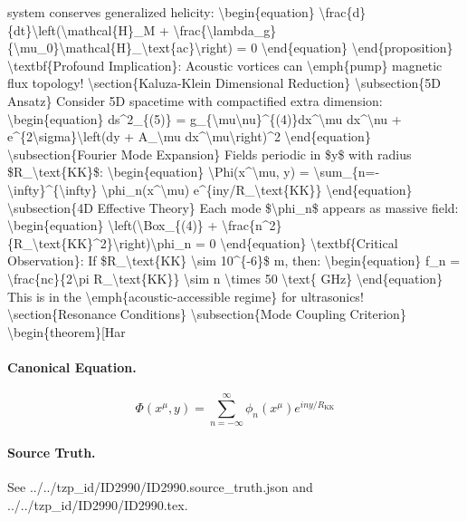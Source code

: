 system conserves generalized helicity: \textbackslash{}begin\{equation\} \textbackslash{}frac\{d\}\{dt\}\textbackslash{}left(\textbackslash{}mathcal\{H\}\_M + \textbackslash{}frac\{\textbackslash{}lambda\_g\}\{\textbackslash{}mu\_0\}\textbackslash{}mathcal\{H\}\_\textbackslash{}text\{ac\}\textbackslash{}right) = 0 \textbackslash{}end\{equation\} \textbackslash{}end\{proposition\} \textbackslash{}textbf\{Profound Implication\}: Acoustic vortices can \textbackslash{}emph\{pump\} magnetic flux topology! \textbackslash{}section\{Kaluza-Klein Dimensional Reduction\} \textbackslash{}subsection\{5D Ansatz\} Consider 5D spacetime with compactified extra dimension: \textbackslash{}begin\{equation\} ds\textasciicircum{}2\_\{(5)\} = g\_\{\textbackslash{}mu\textbackslash{}nu\}\textasciicircum{}\{(4)\}dx\textasciicircum{}\textbackslash{}mu dx\textasciicircum{}\textbackslash{}nu + e\textasciicircum{}\{2\textbackslash{}sigma\}\textbackslash{}left(dy + A\_\textbackslash{}mu dx\textasciicircum{}\textbackslash{}mu\textbackslash{}right)\textasciicircum{}2 \textbackslash{}end\{equation\} \textbackslash{}subsection\{Fourier Mode Expansion\} Fields periodic in \$y\$ with radius \$R\_\textbackslash{}text\{KK\}\$: \textbackslash{}begin\{equation\} \textbackslash{}Phi(x\textasciicircum{}\textbackslash{}mu, y) = \textbackslash{}sum\_\{n=-\textbackslash{}infty\}\textasciicircum{}\{\textbackslash{}infty\} \textbackslash{}phi\_n(x\textasciicircum{}\textbackslash{}mu) e\textasciicircum{}\{iny/R\_\textbackslash{}text\{KK\}\} \textbackslash{}end\{equation\} \textbackslash{}subsection\{4D Effective Theory\} Each mode \$\textbackslash{}phi\_n\$ appears as massive field: \textbackslash{}begin\{equation\} \textbackslash{}left(\textbackslash{}Box\_\{(4)\} + \textbackslash{}frac\{n\textasciicircum{}2\}\{R\_\textbackslash{}text\{KK\}\textasciicircum{}2\}\textbackslash{}right)\textbackslash{}phi\_n = 0 \textbackslash{}end\{equation\} \textbackslash{}textbf\{Critical Observation\}: If \$R\_\textbackslash{}text\{KK\} \textbackslash{}sim 10\textasciicircum{}\{-6\}\$ m, then: \textbackslash{}begin\{equation\} f\_n = \textbackslash{}frac\{nc\}\{2\textbackslash{}pi R\_\textbackslash{}text\{KK\}\} \textbackslash{}sim n \textbackslash{}times 50 \textbackslash{}text\{ GHz\} \textbackslash{}end\{equation\} This is in the \textbackslash{}emph\{acoustic-accessible regime\} for ultrasonics! \textbackslash{}section\{Resonance Conditions\} \textbackslash{}subsection\{Mode Coupling Criterion\} \textbackslash{}begin\{theorem\}[Har

\paragraph{Canonical Equation.}
\[
\begin{equation} \Phi(x^\mu, y) = \sum_{n=-\infty}^{\infty} \phi_n(x^\mu) e^{iny/R_\text{KK}} \end{equation}
\]

\paragraph{Source Truth.}
See ../../tzp\_id/ID2990/ID2990.source\_truth.json and ../../tzp\_id/ID2990/ID2990.tex.
